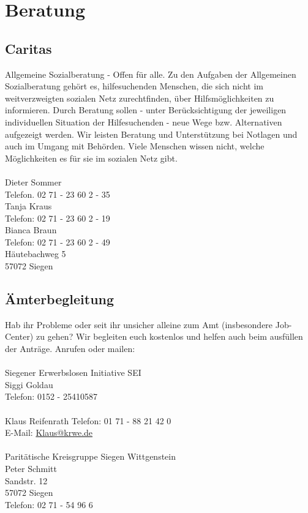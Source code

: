 \chapter{Beratung} 

\section{Caritas}
Allgemeine Sozialberatung - Offen für alle. Zu den Aufgaben der Allgemeinen Sozialberatung gehört es, hilfesuchenden Menschen, die sich nicht im weitverzweigten sozialen Netz zurechtfinden, über Hilfsmöglichkeiten zu informieren.  Durch Beratung sollen - unter Berücksichtigung der jeweiligen individuellen Situation der Hilfesuchenden - neue Wege bzw. Alternativen aufgezeigt werden. Wir leisten Beratung und Unterstützung bei Notlagen und auch im Umgang mit Behörden. Viele Menschen wissen nicht, welche Möglichkeiten es für sie im sozialen Netz gibt.\\
\\
Dieter Sommer \\
Telefon. 02 71 - 23 60 2 - 35\\ 
Tanja Kraus \\
Telefon: 02 71 - 23 60 2 - 19 \\
Bianca Braun \\
Telefon: 02 71 - 23 60 2 - 49\\  
Häutebachweg 5\\
57072 Siegen 

\section{Ämterbegleitung}
Hab ihr Probleme oder seit ihr unsicher alleine zum Amt (insbesondere Job-Center) zu gehen?  Wir begleiten euch kostenlos und helfen auch beim ausfüllen der Anträge. Anrufen oder mailen:\\
\\
Siegener Erwerbslosen Initiative  SEI \\
Siggi Goldau \\
Telefon: 0152 - 25410587 \\
\\
Klaus Reifenrath 
Telefon: 01 71 - 88 21 42 0\\
E-Mail: \href{mailto:Klaus@krwe.de}{Klaus@krwe.de}\\
\\
Paritätische Kreisgruppe Siegen Wittgenstein\\ 
Peter Schmitt\\
Sandstr. 12\\
57072 Siegen\\
Telefon: 02 71 - 54 96 6

